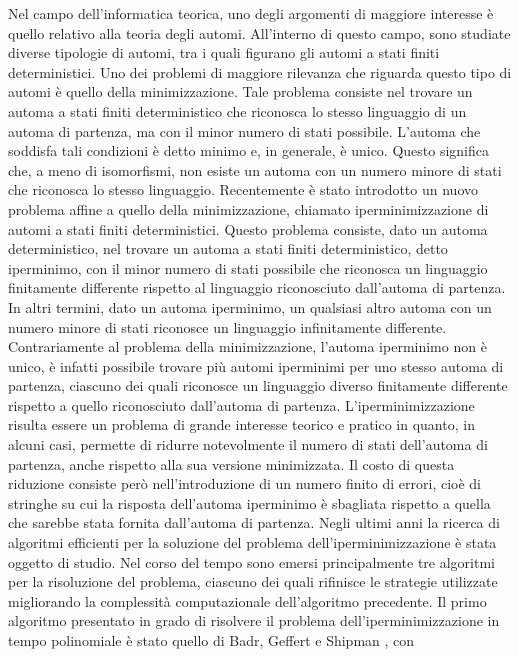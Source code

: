 \documentclass[a4paper,12pt]{report} %
\begin{document}
Nel campo dell'informatica teorica, uno degli argomenti di maggiore interesse è quello relativo alla 
teoria degli automi. All'interno di questo campo, sono studiate diverse tipologie di automi, tra i quali
figurano gli automi a stati finiti deterministici. Uno dei problemi di maggiore rilevanza che riguarda
questo tipo di automi è quello della minimizzazione. Tale problema consiste nel trovare un automa a stati finiti
deterministico che riconosca lo stesso linguaggio di un automa di partenza, ma con il minor numero di 
stati possibile. L'automa che soddisfa tali condizioni è detto minimo e, in generale, è unico.
Questo significa che, a meno di isomorfismi, non esiste un automa con un numero minore di stati che 
riconosca lo stesso linguaggio. Recentemente è stato introdotto un nuovo problema affine a quello
della minimizzazione, chiamato iperminimizzazione di automi a stati finiti deterministici. 
Questo problema consiste, dato un automa deterministico, nel trovare un automa a stati finiti
deterministico, detto iperminimo, con il minor numero di stati possibile che riconosca un linguaggio
finitamente differente rispetto al linguaggio riconosciuto dall'automa di partenza.
In altri termini, dato un automa iperminimo, un qualsiasi altro automa
con un numero minore di stati riconosce un linguaggio infinitamente differente.
Contrariamente al problema della minimizzazione, l'automa iperminimo non è unico, è infatti possibile 
trovare più automi iperminimi per uno stesso automa di partenza, ciascuno dei quali
riconosce un linguaggio diverso finitamente differente rispetto a quello riconosciuto dall'automa di partenza.
L'iperminimizzazione risulta essere un problema di grande interesse teorico e pratico in quanto, in 
alcuni casi, permette di ridurre notevolmente il numero di stati dell'automa di partenza, anche rispetto
alla sua versione minimizzata. Il costo di questa riduzione consiste però nell'introduzione di un numero
finito di errori, cioè di stringhe su cui la risposta dell'automa iperminimo è sbagliata rispetto a quella
che sarebbe stata fornita dall'automa di partenza.
Negli ultimi anni la ricerca di algoritmi efficienti per la soluzione del problema dell'iperminimizzazione
è stata oggetto di studio. Nel corso del tempo sono emersi principalmente 
tre algoritmi per la risoluzione del problema, ciascuno dei quali rifinisce le strategie utilizzate migliorando
la complessità computazionale dell'algoritmo precedente. Il primo algoritmo presentato in grado di risolvere
il problema dell'iperminimizzazione in tempo polinomiale è stato quello di Badr, Geffert e Shipman \parencite{BGS09}, con 
\end{document}
